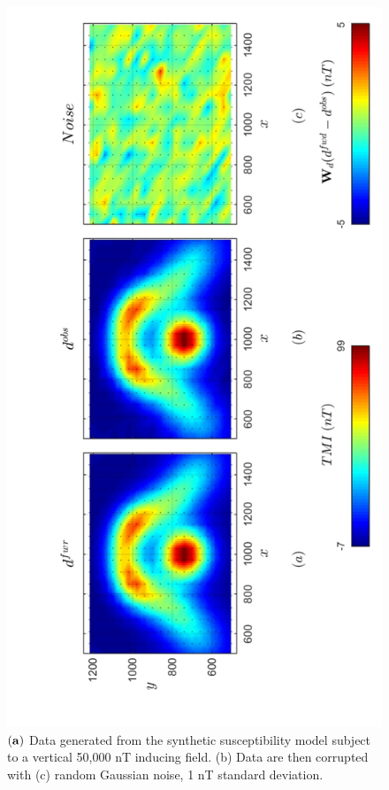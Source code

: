 \begin{figure}[h!]
\centering
\includegraphics[scale=0.52, angle =270]{3D_Data_INDUCED.pdf}
\caption{ $\bf{(a)}$ Data generated from the synthetic susceptibility model subject to a vertical 50,000 nT inducing field. (b) Data are then corrupted with (c) random Gaussian noise, 1 nT standard deviation.}
\label{fig:3D_Data_INDUCED}
\end{figure}


